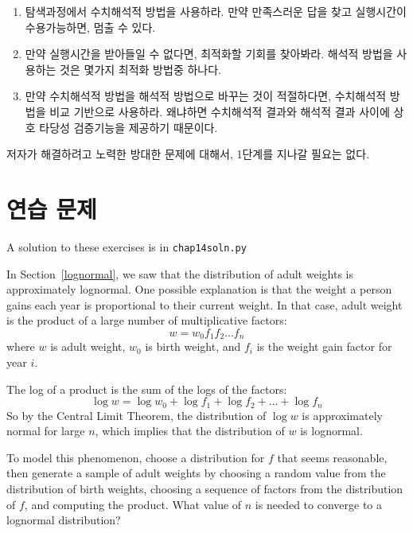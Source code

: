 \begin{enumerate}

\item 탐색과정에서 수치해석적 방법을 사용하라. 만약 만족스러운 답을 찾고 실행시간이 수용가능하면, 멈출 수 있다.

\item 만약 실행시간을 받아들일 수 없다면, 최적화할 기회를 찾아봐라. 해석적 방법을 사용하는 것은 몇가지 최적화 방법중 하나다.

\item 만약 수치해석적 방법을 해석적 방법으로 바꾸는 것이 적절하다면, 수치해석적 방법을 비교 기반으로 사용하라. 왜냐하면 수치해석적 결과와 해석적 결과 사이에 상호 타당성 검증기능을 제공하기 때문이다.

\end{enumerate}

저자가 해결하려고 노력한 방대한 문제에 대해서, 1단계를 지나갈 필요는 없다.


\section{연습 문제}

A solution to these exercises is in \verb"chap14soln.py"

\begin{exercise}
\label{log_clt}
In Section~\ref{lognormal}, we saw that the distribution
of adult weights is approximately lognormal.  One possible
explanation is that the weight a person
gains each year is proportional to their current weight.
In that case, adult weight is the product of a large number
of multiplicative factors:
%
\[ w = w_0 f_1 f_2 ... f_n  \]
%
where $w$ is adult weight, $w_0$ is birth weight, and $f_i$
is the weight gain factor for year $i$.

The log of a product is the sum of the logs of the
factors:
%
\[ \log w = \log w_0 + \log f_1 + \log f_2 + ... + \log f_n \]
%
So by the Central Limit Theorem, the distribution of $\log w$ is
approximately normal for large $n$, which implies that the
distribution of $w$ is lognormal.

To model this phenomenon, choose a distribution for $f$ that seems
reasonable, then generate a sample of adult weights by choosing a
random value from the distribution of birth weights, choosing a
sequence of factors from the distribution of $f$, and computing the
product.  What value of $n$ is needed to converge to a lognormal
distribution?


\end{exercise}



